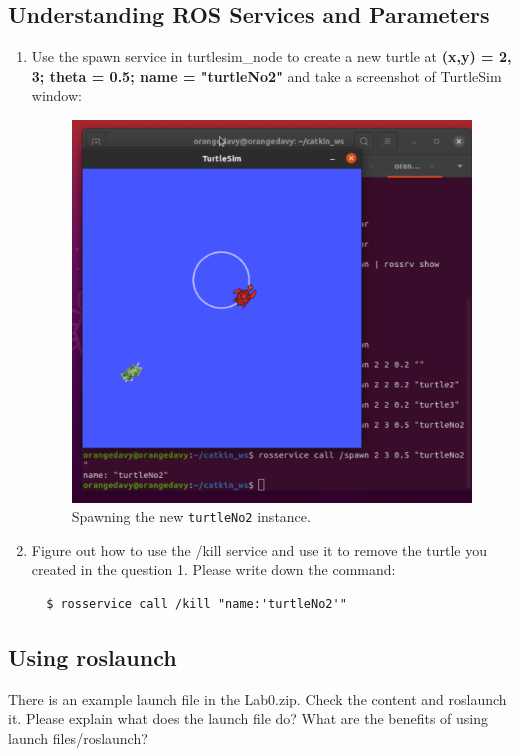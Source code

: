 \documentclass[12pt]{article}
\begin{document}
\subsection{Understanding ROS Services and Parameters}
\begin{enumerate}
\item Use the spawn service in turtlesim\_node to create a new turtle at \textbf{(x,y) = 2, 3; theta = 0.5; name = "turtleNo2"} and take a screenshot of TurtleSim window:

\begin{figure}[H]
  \centering\includegraphics[width=14cm]{images/turtle_no_2.png}\vspace{-10pt}
  \caption{Spawning the new \texttt{turtleNo2} instance.}\label{fig:turtle_no_2}
  \end{figure}


\item Figure out how to use the /kill service and use it to remove the turtle you created in the question 1. Please write down the command:

\begin{verbatim}
  $ rosservice call /kill "name:'turtleNo2'"
\end{verbatim}

\end{enumerate}

\subsection{Using roslaunch}
There is an example launch file in the Lab0.zip. Check the content and roslaunch it. Please explain what does the launch file do? What are the benefits of using launch files/roslaunch?
\end{document}
